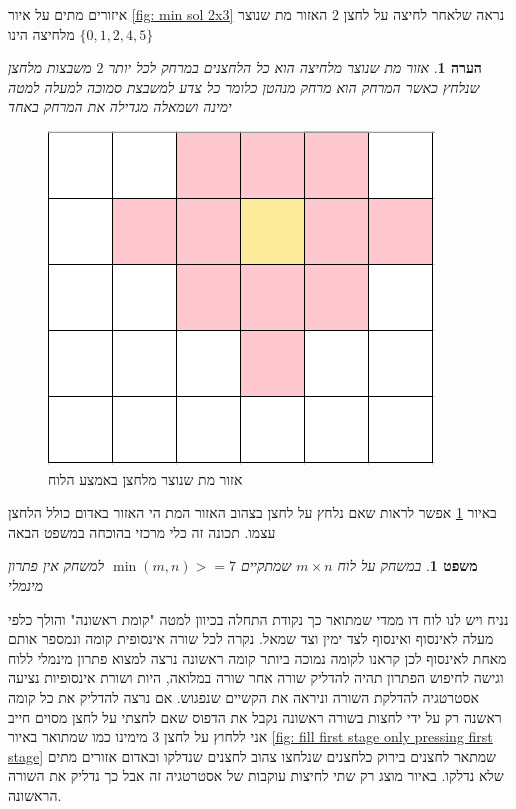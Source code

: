 \documentclass[12pt,twoside]{article}
\newtheorem{theorem}{משפט}[section]
\newtheorem{comm}{הערה}[section]
\begin{document}
איזורים מתים על איור 
\ref{fig: min sol 2x3}
נראה שלאחר לחיצה על
לחצן
$2$
האזור מת שנוצר מלחיצה הינו
$\{0,1,2,4,5\}$

\begin{comm}
    אזור מת שנוצר מלחיצה 
    הוא כל הלחצנים במרחק לכל יותר 
    $2$
    משבצות מלחצן שנלחץ
    כאשר המרחק הוא מרחק מנהטן כלומר כל צדע למשבצת סמוכה למעלה למטה ימינה ושמאלה מגדילה את המרחק באחד
\end{comm}

\begin{figure}[ht]
    \caption{אזור מת שנוצר מלחצן באמצע הלוח}
    \label{fig: dead zone}
    \unsethebrew
    \centering
    \includegraphics[width=.7\textwidth,height=.7\textheight,keepaspectratio]{images/dead_zone.PNG}
\end{figure}
\sethebrew

באיור 
\ref{fig: dead zone}
אפשר לראות שאם נלחץ על לחצן בצהוב האזור המת הי האזור באדום כולל 
הלחצן עצמו.
תכונה זה כלי מרכזי בהוכחה במשפט הבאה

\begin{theorem}
    \label{thrm: bigger then 7x7 board no minimal solution}
    במשחק על לוח 
    $m \times n$
    שמתקיים
    $\min(m,n) >= 7$
    למשחק אין פתרון מינמלי
\end{theorem}

נניח ויש לנו לוח דו ממדי שמתואר כך נקודת התחלה בכיוון למטה 
"קומת ראשונה"
והולך כלפי מעלה לאינסוף 
ואינסוף לצד ימין וצד שמאל.
נקרה לכל שורה אינסופית
קומה ונמספר אותם מאחת לאינסוף לכן קראנו לקומה נמוכה ביותר קומה ראשונה
נרצה למצוא פתרון מינמלי ללוח
וגישה לחיפוש הפתרון תהיה
להדליק שורה אחר שורה במלואה,
היות ושורת אינסופיות נציעה אסטרטגיה להדלקת השורה וניראה את הקשיים שנפגוש.
אם נרצה להדליק 
את כל קומה ראשנה רק על ידי לחצות 
בשורה ראשונה נקבל את הדפוס 
שאם לחצתי על לחצן מסוים חייב אני ללחוץ על לחצן
$3$
מימינו
כמו שמתואר באיור
\ref{fig: fill first stage only pressing first stage}
שמתאר לחצנים בירוק כלחצנים שנלחצו 
צהוב לחצנים שנדלקו ובאדום אזורים מתים שלא נדלקו.
באיור מוצג רק שתי לחיצות עוקבות של אסטרטגיה זה אבל כך נדליק את השורה הראשונה.
\end{document}
